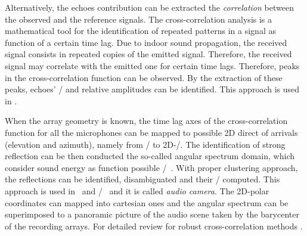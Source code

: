 Alternatively, the echoes contribution can be extracted the \textit{correlation} between the observed and the reference signals.
The cross-correlation analysis is a mathematical tool for the identification of repeated patterns in a signal as function of a certain time lag.
Due to indoor sound propagation, the received signal consists in repeated copies of the emitted signal.
Therefore, the received signal may correlate with the emitted one for certain time lags.
Therefore, peaks in the cross-correlation function can be observed.
By the extraction of these peaks, echoes' \TOAs/ and relative amplitudes can be identified.
This approach is used in .

When the array geometry is known, the time lag axes of the cross-correlation function for all the microphones can be mapped to possible 2D direct of arrivals (elevation and azimuth), namely from \TOAs/ to 2D-\DOAs/.
The identification of strong reflection can be then conducted the so-called angular spectrum domain, which consider sound energy as function possible \DOAs/~.
With proper clustering approach, the reflections can be identified, disambiguated and their \TOAs/ computed.
This approach is used in~ and \SSL/~ and it is called \textit{audio camera}.
The 2D-polar coordinates can mapped into cartesian ones and the angular spectrum can be superimposed to a panoramic picture of the audio scene taken by the barycenter of the recording arrays.
For detailed review for robust cross-correlation methods .

